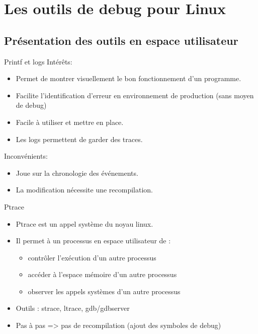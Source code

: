 \section{Les outils de debug pour Linux}

\subsection{Présentation des outils en espace utilisateur}

\begin{frame}{Printf et logs}
Intérêts:
\begin{itemize}
	\item
		Permet de montrer visuellement le bon fonctionnement d'un programme.
	\item
		Facilite l'identification d'erreur en environnement de production (sans moyen de debug)
	\item
		Facile à utiliser et mettre en place.
	\item
		Les logs permettent de garder des traces.
\end{itemize}
Inconvénients:
\begin{itemize}
	\item
		Joue sur la chronologie des événements.
	\item
		La modification nécessite une recompilation.
\end{itemize}
\end{frame}

\begin{frame}{Ptrace}
\begin{itemize}
	\item
		Ptrace est un appel système du noyau linux.
	\item
		Il permet à un processus en espace utilisateur de :
		\begin{itemize}
			\item
				contrôler l’exécution d'un autre processus
			\item
				accéder à l'espace mémoire d'un autre processus
			\item
				observer les appels systèmes d'un autre processus
		\end{itemize}
	\item
		Outils : strace, ltrace, gdb/gdbserver
	\item
		Pas à pas => pas de recompilation (ajout des symboles de debug)
\end{itemize}
\end{frame}

